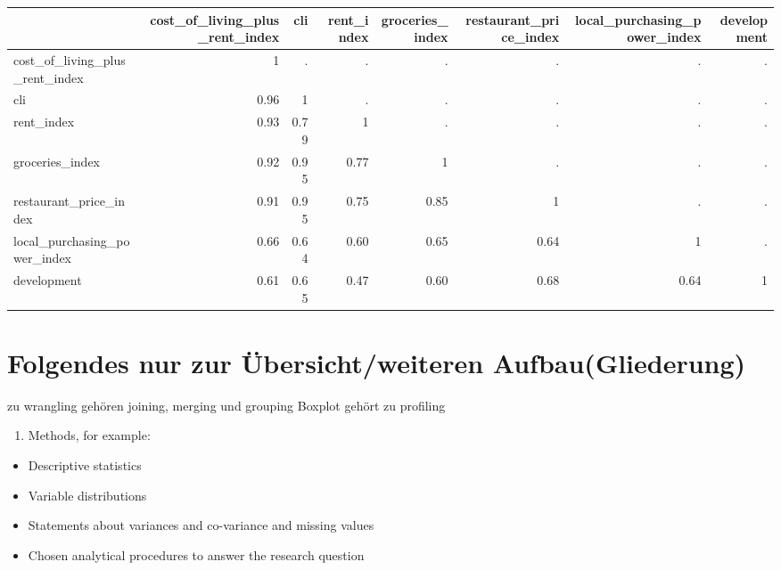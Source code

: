 \documentclass[
  11pt,
  a4paper,
  twoside]{scrbook}
\providecommand{\tightlist}{%
  \setlength{\itemsep}{0pt}\setlength{\parskip}{0pt}}
\begin{document}
\begin{table}
\centering
\begin{tabular}[t]{lrrrrrrr}
\toprule
  & cost\_of\_living\_plus\_rent\_index & cli & rent\_index & groceries\_index & restaurant\_price\_index & local\_purchasing\_power\_index & development\\
\midrule
cost\_of\_living\_plus\_rent\_index & 1 & . & . & . & . & . & .\\
cli & \num{.96} & 1 & . & . & . & . & .\\
rent\_index & \num{.93} & \num{.79} & 1 & . & . & . & .\\
groceries\_index & \num{.92} & \num{.95} & \num{.77} & 1 & . & . & .\\
restaurant\_price\_index & \num{.91} & \num{.95} & \num{.75} & \num{.85} & 1 & . & .\\
local\_purchasing\_power\_index & \num{.66} & \num{.64} & \num{.60} & \num{.65} & \num{.64} & 1 & .\\
development & \num{.61} & \num{.65} & \num{.47} & \num{.60} & \num{.68} & \num{.64} & 1\\
\bottomrule
\end{tabular}
\end{table}

\hypertarget{folgendes-nur-zur-uxfcbersichtweiteren-aufbaugliederung}{%
\section{Folgendes nur zur Übersicht/weiteren Aufbau(Gliederung)}\label{folgendes-nur-zur-uxfcbersichtweiteren-aufbaugliederung}}

zu wrangling gehören joining, merging und grouping
Boxplot gehört zu profiling

\begin{enumerate}
\def\labelenumi{\arabic{enumi}.}
\setcounter{enumi}{2}
\tightlist
\item
  Methods, for example:
\end{enumerate}

\begin{itemize}
\tightlist
\item
  Descriptive statistics
\item
  Variable distributions
\item
  Statements about variances and co-variance and missing values
\item
  Chosen analytical procedures to answer the research question
\end{itemize}
\end{document}
